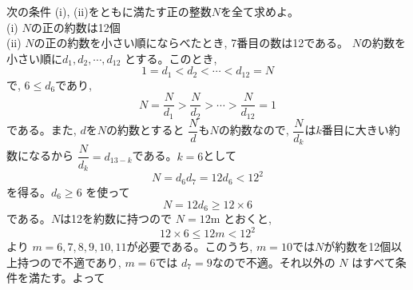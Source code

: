 次の条件 (i), (ii)をともに満たす正の整数$N$を全て求めよ。\\
(i) $N$の正の約数は12個\\
(ii) $N$の正の約数を小さい順にならべたとき, 7番目の数は12である。
\enthm
$N$の約数を小さい順に$d_1, d_2,\cdots , d_{12}$ とする。このとき,
\[1=d_1<d_2<\cdots <d_{12}=N\]
で, $6\leq d_6$であり,
\[N=\dfrac{N}{d_1}>\dfrac{N}{d_2}>\cdots > \dfrac{N}{d_{12}}=1\]
である。また, $d$を$N$の約数とすると $\dfrac{N}{d}$も$N$の約数なので, $\dfrac{N}{d_k}$は$k$番目に大きい約数になるから $\dfrac{N}{d_k}=d_{13-k}$である。$k=6$として 
\[ N=d_6d_7=12d_6<12^2\]
を得る。$d_6\geq 6$ を使って
\[N=12d_6\geq 12\times 6\]
である。$N$は12を約数に持つので $N=12$m とおくと, 
\[12\times 6\leq 12m<12^2\]
より $m=6,7,8,9,10,11$が必要である。このうち, $m=10$では$N$が約数を12個以上持つので不適であり, $m=6$では $d_7=9$なので不適。それ以外の $N$ はすべて条件を満たす。よって {}
